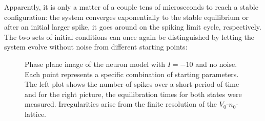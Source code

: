 \documentclass[12pt,a4paper]{article}
\begin{document}
Apparently, it is only a matter of a couple tens of microseconds to reach a stable configuration: the system converges exponentially to the stable equilibrium or after an initial larger spike, it goes around on the spiking limit cycle, respectively.\\
The two sets of initial conditions can once again be distinguished by letting the system evolve without noise from different starting points:
\begin{figure}[H]
	\hspace*{-0.5cm}
	
	\caption{Phase plane image of the neuron model with $I=-10$ and no noise. Each point represents a specific combination of starting parameters. The left plot shows the number of spikes over a short period of time and for the right picture, the equilibration times for both states were measured. Irregularities arise from the finite resolution of the $V_0$-$n_0$-lattice.}
	\label{twodomrinzel}
\end{figure}
\end{document}
